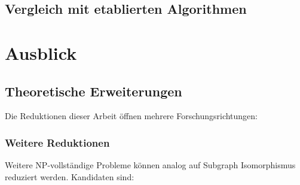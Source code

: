 ﻿\documentclass[a4paper,12pt]{article}
\theoremstyle{definition}
\begin{document}
\subsection{Vergleich mit etablierten Algorithmen}

\begin{table}[h]
	\centering
	\caption{Vergleich klassischer mit Subgraph Isomorphismus-basierten Methoden.}
\end{table}

\section{Ausblick}\label{sec:ausblick}

\subsection{Theoretische Erweiterungen}

Die Reduktionen dieser Arbeit öffnen mehrere Forschungsrichtungen:

\subsubsection{Weitere Reduktionen}

Weitere NP-vollständige Probleme können analog auf Subgraph Isomorphismus reduziert werden. Kandidaten sind:
\end{document}
